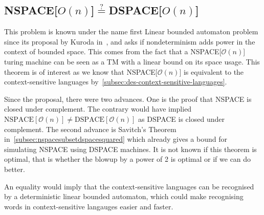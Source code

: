 \subsection{NSPACE[$O(n)$]$\overset{?}{=}$DSPACE[$O(n)$]}\label{subsec:nspacedspace}

This problem is known under the name first Linear bounded automaton problem since its proposal by Kuroda in~\cite{Kuroda1964}, and asks if nondeterminism adds power in the context of bounded space.
This comes from the fact that a NSPACE[$\mathcal{O}(n)$] turing machine can be seen as a TM with a linear bound on its space usage.
This theorem is of interest as we know that NSPACE[$\mathcal{O}(n)$] is equivalent to the context-sensitive languages by~\cref{subsec:des-context-sensitive-languages}.

Since the proposal, there were two advances.
One is the proof that NSPACE is closed under complement.
The contrary would have implied $\text{NSPACE}[\mathcal{O}(n)] \neq \text{DSPACE}[\mathcal{O}(n)]$ as DSPACE is closed under complement.
The second advance is Savitch's Theorem in~\cref{subsec:nspacesubsetdspacesquared} which already gives a bound for simulating NSPACE using DSPACE machines.
It is not known if this theorem is optimal, that is whether the blowup by a power of 2 is optimal or if we can do better.

An equality would imply that the context-sensitive languages can be recognised by a deterministic linear bounded automaton, which could make recognising words in context-sensitive langauges easier and faster.